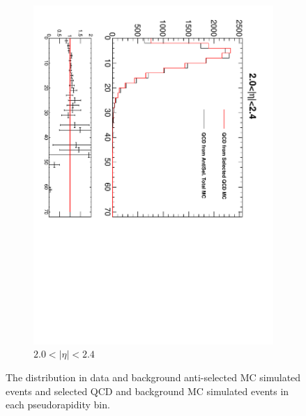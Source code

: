 \begin{figure}[htbp]
\begin{subfigure}{0.45\textwidth}
    \includegraphics*[trim = 0mm 0mm 15mm 0mm, clip, width=\textwidth, angle=90]{MetCompare_anti_eta6.pdf}
    \caption{$2.0<| \eta |<2.4$}
    \label{fig:qcd_met_eta6}
  \end{subfigure}
  \caption[The \ETm distribution in data and background anti-selected {MC}
simulated events and selected {QCD} and \gjet background MC simulated events.]
{The \ETm distribution in data and background anti-selected {MC} simulated
events and selected {QCD} and \gjet background MC simulated events in each
pseudorapidity bin\cite{baisini2010electron}.}
  \label{tab:antiselclosure}
\end{figure}

